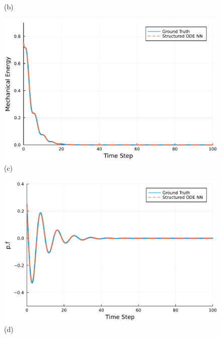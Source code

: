 \documentclass[
	parskip, 			   %
	twoside, 			   %
	DIV=14, 			   %
	BCOR=15.0mm, 		   %
	headsepline, 		   %
	open=right, 		   %
	captions=tableheading, %
	bibliography=totoc,    %
	numbers=noenddot       %
]{scrreprt}
\begin{document}
\begin{figure}[h!]
\begin{minipage}{.3\textwidth}
    \\(b)
    \end{minipage}%
    \begin{minipage}{.3\textwidth}
    \centering
    \includegraphics[width=1\linewidth]{figures/Hamiltonian_evolution_compositional_idho.pdf}
    \\(c)
    \end{minipage}
    \begin{minipage}{.3\textwidth}
    \centering
    \includegraphics[width=1\linewidth]{figures/p.f_compositional_idho.pdf}
    \\(d)
    \end{minipage}%
    \begin{minipage}{.3\textwidth}
    \centering

\end{minipage}
\end{figure}
\end{document}
